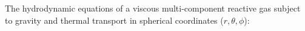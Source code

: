 \documentclass[10pt,paper=a4]{report}
\begin{document}
The hydrodynamic equations of a viscous multi-component reactive gas subject to gravity and thermal transport in spherical coordinates ($r, \theta, \phi$):
%



\fontsize{9pt}{20pt}
\end{document}
